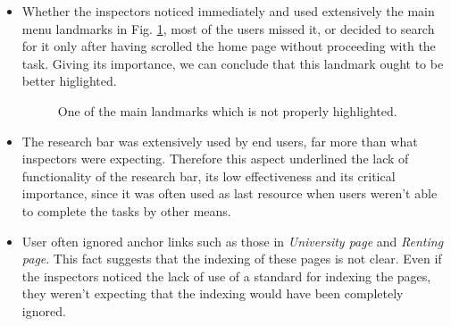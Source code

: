 \begin{itemize}
    \item Whether the inspectors noticed immediately and used extensively the main menu landmarks in Fig. \ref{fig:comparison-1}, most of the users missed it, or decided to search for it only after having scrolled the home page without proceeding with the task. Giving its importance, we can conclude that this landmark ought to be better higlighted.
    \begin{figure}[!ht]
        \begin{minipage}{\linewidth}
            \centering
            \captionsetup{justification=centering}
            \caption{One of the main landmarks which is not properly highlighted.}
            \label{fig:comparison-1}
        \end{minipage}
    \end{figure}
\end{itemize}

\begin{itemize}
    \item The research bar was extensively used by end users, far more than what inspectors were expecting. Therefore this aspect underlined the lack of functionality of the research bar, its low effectiveness and its critical importance, since it was often used as last resource when users weren't able to complete the tasks by other means.
\end{itemize}

\begin{itemize}
    \item User often ignored anchor links such as those in \emph{University page} and \emph{Renting page}. This fact suggests that the indexing of these pages is not clear. Even if the inspectors noticed the lack of use of a standard for indexing the pages, they weren't expecting that the indexing would have been completely ignored. 
\end{itemize}


